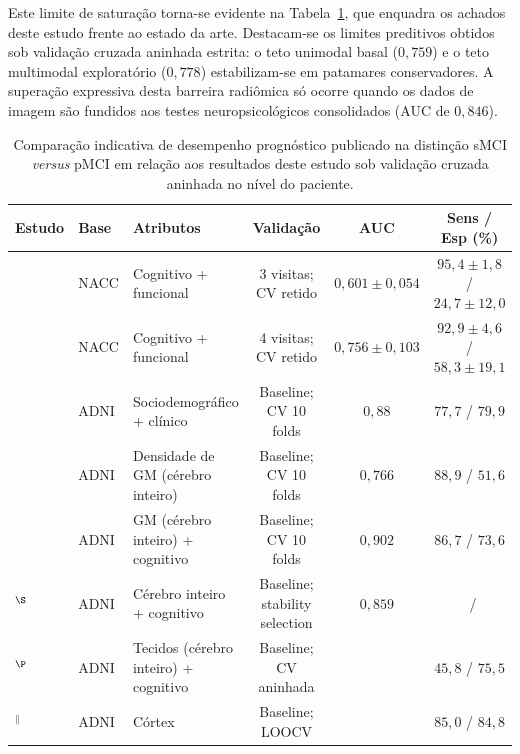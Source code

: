 \documentclass[review]{elsarticle}
\begin{document}
	Este limite de saturação torna-se evidente na Tabela~\ref{tab:literature_comparison}, que enquadra os achados deste estudo frente ao estado da arte. Destacam-se os limites preditivos obtidos sob validação cruzada aninhada estrita: o teto unimodal basal ($0{,}759$) e o teto multimodal exploratório ($0{,}778$) estabilizam-se em patamares conservadores. A superação expressiva desta barreira radiômica só ocorre quando os dados de imagem são fundidos aos testes neuropsicológicos consolidados (AUC de $0{,}846$).
	
	\begin{table}
		\centering
		\footnotesize
		\setlength{\tabcolsep}{4pt}
		\renewcommand{\arraystretch}{1.15}
		\caption{Comparação indicativa de desempenho prognóstico publicado na distinção sMCI \emph{versus} pMCI em relação aos resultados deste estudo sob validação cruzada aninhada no nível do paciente.}
		\label{tab:literature_comparison}
		\begin{tabular}{@{}lllccc@{}}
			\toprule
			\textbf{Estudo} & \textbf{Base} & \textbf{Atributos} &
			\textbf{Validação} & \textbf{AUC} & \textbf{Sens / Esp (\%)} \\
			\midrule
			\citet{bucholc-2023} & NACC &
			Cognitivo + funcional &
			3 visitas; CV retido &
			$0{,}601 \pm 0{,}054$ & $95{,}4 \pm 1{,}8$ / $24{,}7 \pm 12{,}0$ \\
			\citet{bucholc-2023} & NACC &
			Cognitivo + funcional &
			4 visitas; CV retido &
			$0{,}756 \pm 0{,}103$ & $92{,}9 \pm 4{,}6$ / $58{,}3 \pm 19{,}1$ \\
			\citet{grassi-2019} & ADNI &
			Sociodemográfico + clínico &
			Baseline; CV 10 folds &
			$0{,}88$ & $77{,}7$ / $79{,}9$ \\
			\citet{moradi-2015} & ADNI &
			Densidade de GM (cérebro inteiro) &
			Baseline; CV 10 folds &
			$0{,}766$ & $88{,}9$ / $51{,}6$ \\
			\citet{moradi-2015} & ADNI &
			GM (cérebro inteiro) + cognitivo &
			Baseline; CV 10 folds &
			$0{,}902$ & $86{,}7$ / $73{,}6$ \\
			\citet{ye-2012}$^{\S}$ & ADNI &
			Cérebro inteiro + cognitivo &
			Baseline; stability selection &
			$0{,}859$ & \textemdash\ / \textemdash \\
			\citet{casanova-2013}$^{\P}$ & ADNI &
			Tecidos (cérebro inteiro) + cognitivo &
			Baseline; CV aninhada &
			\textemdash & $45{,}8$ / $75{,}5$ \\
			\citet{guo-2017a}$^{\|}$ & ADNI &
			Córtex &
			Baseline; LOOCV &
			\textemdash & $85{,}0$ / $84{,}8$ \\

\end{tabular}
\end{table}
\end{document}
